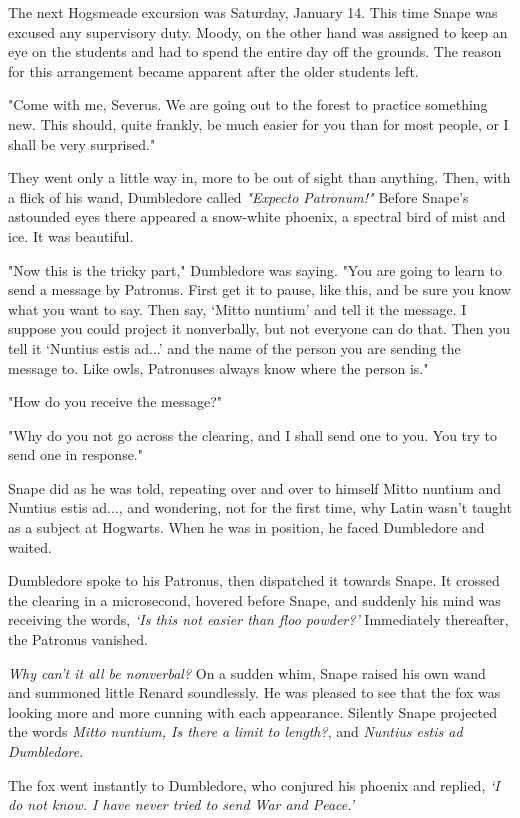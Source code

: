 The next Hogsmeade excursion was Saturday, January 14. This time Snape was excused any supervisory duty. Moody, on the other hand was assigned to keep an eye on the students and had to spend the entire day off the grounds. The reason for this arrangement became apparent after the older students left.

"Come with me, Severus. We are going out to the forest to practice something new. This should, quite frankly, be much easier for you than for most people, or I shall be very surprised."

They went only a little way in, more to be out of sight than anything. Then, with a flick of his wand, Dumbledore called \emph{"Expecto Patronum!"} Before Snape's astounded eyes there appeared a snow-white phoenix, a spectral bird of mist and ice. It was beautiful.

"Now this is the tricky part," Dumbledore was saying. "You are going to learn to send a message by Patronus. First get it to pause, like this, and be sure you know what you want to say. Then say, `Mitto nuntium' and tell it the message. I suppose you could project it nonverbally, but not everyone can do that. Then you tell it `Nuntius estis ad...' and the name of the person you are sending the message to. Like owls, Patronuses always know where the person is."

"How do you receive the message?"

"Why do you not go across the clearing, and I shall send one to you. You try to send one in response."

Snape did as he was told, repeating over and over to himself Mitto nuntium and Nuntius estis ad..., and wondering, not for the first time, why Latin wasn't taught as a subject at Hogwarts. When he was in position, he faced Dumbledore and waited.

Dumbledore spoke to his Patronus, then dispatched it towards Snape. It crossed the clearing in a microsecond, hovered before Snape, and suddenly his mind was receiving the words, \emph{`Is this not easier than floo powder?'} Immediately thereafter, the Patronus vanished.

\emph{Why can't it all be nonverbal?} On a sudden whim, Snape raised his own wand and summoned little Renard soundlessly. He was pleased to see that the fox was looking more and more cunning with each appearance. Silently Snape projected the words \emph{Mitto nuntium, Is there a limit to length?}, and \emph{Nuntius estis ad Dumbledore}.

The fox went instantly to Dumbledore, who conjured his phoenix and replied, \emph{`I do not know. I have never tried to send War and Peace.'}

